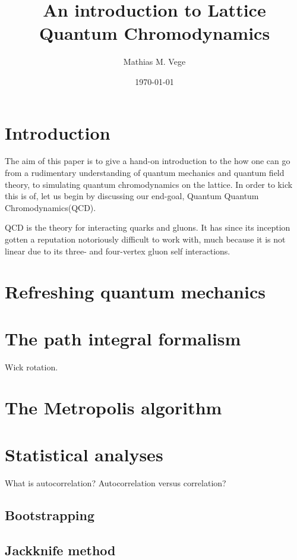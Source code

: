 \documentclass[11pt]{article}
\title{An introduction to Lattice Quantum Chromodynamics}
\author{Mathias M. Vege}
\date{\today}
\begin{document}
\maketitle

\begin{abstract}

\end{abstract}


\section{Introduction}
The aim of this paper is to give a hand-on introduction to the how one can go from a rudimentary understanding of quantum mechanics and quantum field theory, to simulating quantum chromodynamics on the lattice. In order to kick this is of, let us begin by discussing our end-goal, Quantum Quantum Chromodynamics(QCD).

QCD is the theory for interacting quarks and gluons. It has since its inception gotten a reputation notoriously difficult to work with, much because it is not linear due to its three- and four-vertex gluon self interactions. 

\section{Refreshing quantum mechanics}
\section{The path integral formalism}
Wick rotation.
\section{The Metropolis algorithm}
\section{Statistical analyses}
What is autocorrelation? Autocorrelation versus correlation?
\subsection{Bootstrapping}
\subsection{Jackknife method}
\end{document}
